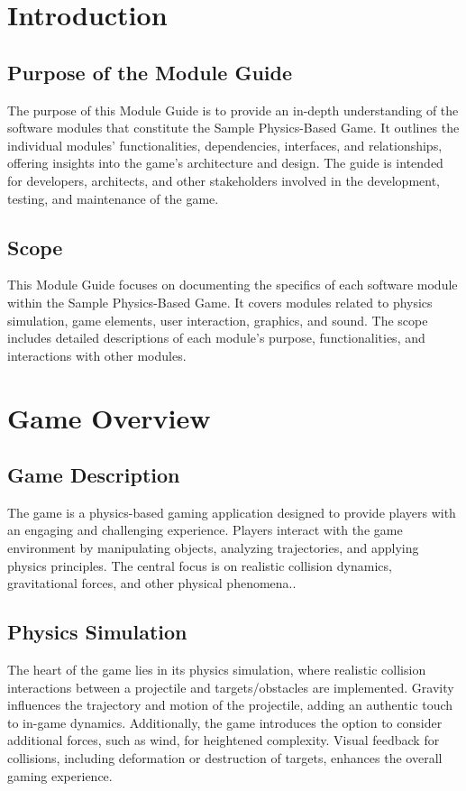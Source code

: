 \documentclass[12pt, titlepage]{article}
\begin{document}
\newpage

\tableofcontents

\listoftables

\listoffigures

\newpage


\section{Introduction}
\subsection{Purpose of the Module Guide}
The purpose of this Module Guide is to provide an in-depth understanding of the software modules that constitute the Sample Physics-Based Game. It outlines the individual modules' functionalities, dependencies, interfaces, and relationships, offering insights into the game's architecture and design. The guide is intended for developers, architects, and other stakeholders involved in the development, testing, and maintenance of the game.
\subsection{Scope}
This Module Guide focuses on documenting the specifics of each software module within the Sample Physics-Based Game. It covers modules related to physics simulation, game elements, user interaction, graphics, and sound. The scope includes detailed descriptions of each module's purpose, functionalities, and interactions with other modules.

\section{Game Overview}
\subsection{Game Description}
The game is a physics-based gaming application designed to provide players with an engaging and challenging experience. Players interact with the game environment by manipulating objects, analyzing trajectories, and applying physics principles. The central focus is on realistic collision dynamics, gravitational forces, and other physical phenomena..

\subsection{Physics Simulation}
The heart of the game lies in its physics simulation, where realistic collision interactions between a projectile and targets/obstacles are implemented. Gravity influences the trajectory and motion of the projectile, adding an authentic touch to in-game dynamics. Additionally, the game introduces the option to consider additional forces, such as wind, for heightened complexity. Visual feedback for collisions, including deformation or destruction of targets, enhances the overall gaming experience.
\end{document}
